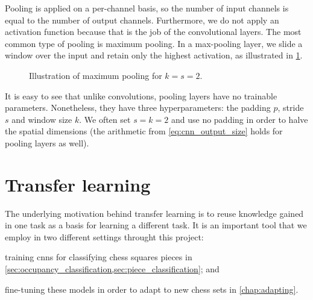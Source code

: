 \documentclass[../report.tex]{subfiles}
\begin{document}
Pooling is applied on a per-channel basis, so the number of input channels is equal to the number of output channels.
Furthermore, we do not apply an activation function because that is the job of the convolutional layers.
The most common type of pooling is maximum pooling.
In a max-pooling layer, we slide a window over the input and retain only the highest activation, as illustrated in \cref{fig:maxpool}.
\begin{figure}
    \centering
    \caption{Illustration of maximum pooling for $k=s=2$.}
    \label{fig:maxpool}
\end{figure}
It is easy to see that unlike convolutions, pooling layers have no trainable parameters.
Nonetheless, they have three hyperparameters: the padding $p$, stride $s$ and window size $k$.
We often set $s=k=2$ and use no padding in order to halve the spatial dimensions (the arithmetic from \cref{eq:cnn_output_size} holds for pooling layers as well).

\section{Transfer learning}
\label{sec:background_transfer_learning}
The underlying motivation behind transfer learning is to reuse knowledge gained in one task as a basis for learning a different task.
It is an important tool that we employ in two different settings throught this project:
\begin{enumerate*}[label=(\roman*)]
    \item training \glspl{cnn} for classifying chess squares pieces in \cref{sec:occupancy_classification,sec:piece_classification}; and
    \item fine-tuning these models in order to adapt to new chess sets in \cref{chap:adapting}.
\end{enumerate*}
\end{document}
